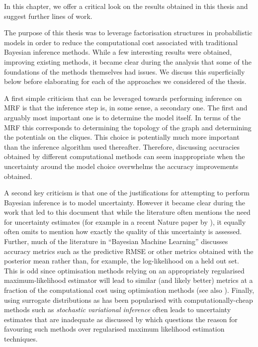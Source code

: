 
In this chapter, we offer a critical look on the results obtained in this thesis and suggest further lines of work.

The purpose of this thesis was to leverage factorisation structures in probabilistic models in order to reduce the computational cost associated with traditional Bayesian inference methods. While a few interesting results were obtained, improving existing methods, it became clear during the analysis that some of the foundations of the methods themselves had issues. We discuss this superficially below before elaborating for each of the approaches we considered of the thesis. 

A first simple criticism that can be leveraged towards performing inference on MRF is that the inference step is, in some sense, a secondary one. The first and arguably most important one is to determine the model itself. In terms of the MRF this corresponds to determining the topology of the graph and determining the potentials on the cliques. This choice is potentially much more important than the inference algorithm used thereafter. Therefore, discussing accuracies obtained by different computational methods can seem inappropriate when the uncertainty around the model choice overwhelms the accuracy improvements obtained. 

A second key criticism is that one of the justifications for attempting to perform Bayesian inference is to model uncertainty. However it became clear during the work that led to this document that while the literature often mentions the need for uncertainty estimates (for example in a recent Nature paper by \citet{ghahramani15}), it equally often omits to mention how exactly the quality of this uncertainty is assessed. 
Further, much of the literature in ``Bayesian Machine Learning'' discusses accuracy metrics such as the predictive RMSE or other metrics obtained with the posterior mean rather than, for example, the log-likelihood on a held out set.
This is odd since optimisation methods relying on an appropriately regularised maximum-likelihood estimator will lead to similar (and likely better) metrics at a fraction of the computational cost using optimisation methods (see also \citet{green15}). %
Finally, using surrogate distributions as has been popularised with computationally-cheap methods such as \emph{stochastic variational inference} \citep{hoffman13} often leads to uncertainty estimates that are inadequate as discussed by \cite{wang05} which questions the reason for favouring such methods over regularised maximum likelihood estimation techniques.

